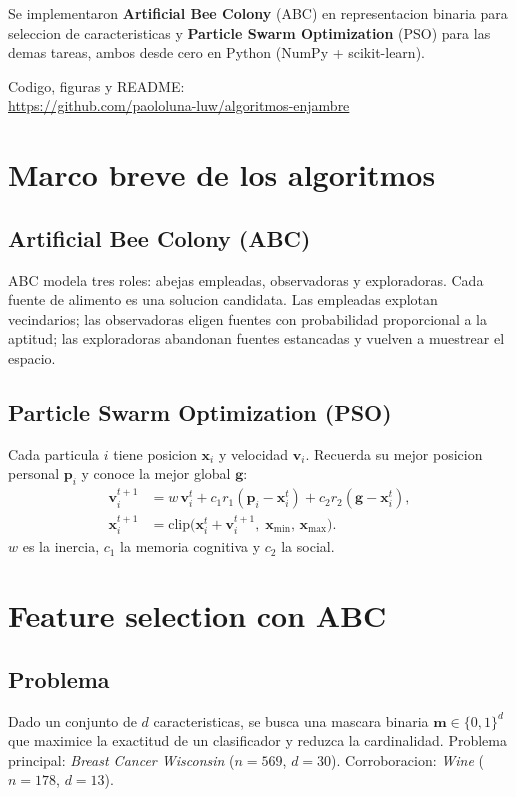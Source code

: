 \documentclass[11pt,oneside]{article}
\begin{document}
Se implementaron \textbf{Artificial Bee Colony} (ABC) en representacion binaria para seleccion de caracteristicas y \textbf{Particle Swarm Optimization} (PSO) para las demas tareas, ambos desde cero en Python (NumPy + scikit-learn).

\begin{cajarepo}
Codigo, figuras y README:\\
\url{https://github.com/paololuna-luw/algoritmos-enjambre}
\end{cajarepo}

\section{Marco breve de los algoritmos}
\subsection{Artificial Bee Colony (ABC)}
ABC modela tres roles: abejas empleadas, observadoras y exploradoras. Cada fuente de alimento es una solucion candidata. Las empleadas explotan vecindarios; las observadoras eligen fuentes con probabilidad proporcional a la aptitud; las exploradoras abandonan fuentes estancadas y vuelven a muestrear el espacio.

\subsection{Particle Swarm Optimization (PSO)}
Cada particula $i$ tiene posicion $\mathbf{x}_i$ y velocidad $\mathbf{v}_i$. Recuerda su mejor posicion personal $\mathbf{p}_i$ y conoce la mejor global $\mathbf{g}$:
\begin{align}
\mathbf{v}_i^{t+1}
&= w\,\mathbf{v}_i^{t}
+ c_1 r_1 (\mathbf{p}_i-\mathbf{x}_i^{t})
+ c_2 r_2 (\mathbf{g}-\mathbf{x}_i^{t}), \\
\mathbf{x}_i^{t+1}
&= \mathrm{clip}\bigl(\mathbf{x}_i^{t}+\mathbf{v}_i^{t+1},\;
\mathbf{x}_{\min},\,\mathbf{x}_{\max}\bigr).
\end{align}
$w$ es la inercia, $c_1$ la memoria cognitiva y $c_2$ la social.

\section{Feature selection con ABC}
\subsection{Problema}
Dado un conjunto de $d$ caracteristicas, se busca una mascara binaria $\mathbf{m}\in\{0,1\}^d$ que maximice la exactitud de un clasificador y reduzca la cardinalidad. Problema principal: \emph{Breast Cancer Wisconsin} ($n=569$, $d=30$). Corroboracion: \emph{Wine} ($n=178$, $d=13$).
\end{document}
